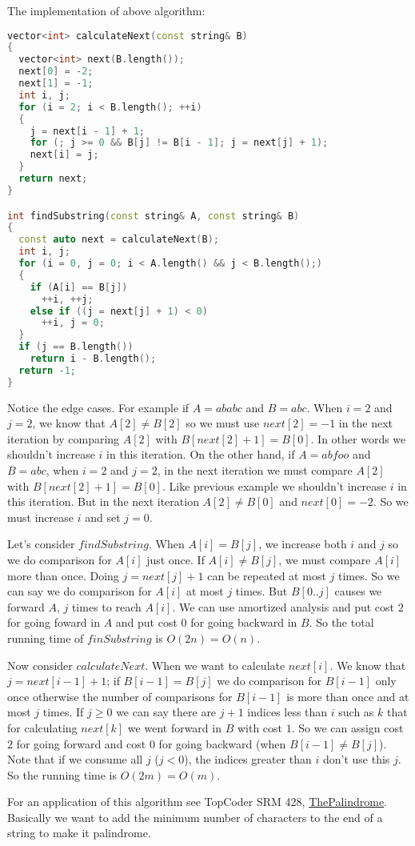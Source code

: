 \documentclass{book}
\begin{document}
	The implementation of above algorithm:
	\begin{lstlisting}[language=c++, frame=single]
vector<int> calculateNext(const string& B)
{
  vector<int> next(B.length());
  next[0] = -2;
  next[1] = -1;
  int i, j;
  for (i = 2; i < B.length(); ++i)
  {
    j = next[i - 1] + 1;
    for (; j >= 0 && B[j] != B[i - 1]; j = next[j] + 1);
    next[i] = j;
  }
  return next;
}

int findSubstring(const string& A, const string& B)
{
  const auto next = calculateNext(B);
  int i, j;
  for (i = 0, j = 0; i < A.length() && j < B.length();)
  {
    if (A[i] == B[j])
      ++i, ++j;
    else if ((j = next[j] + 1) < 0)
      ++i, j = 0;
  }
  if (j == B.length())
    return i - B.length();
  return -1;
}
	\end{lstlisting}
	Notice the edge cases. For example if $A=ababc$ and $B=abc$. When $i = 2$ and $j = 2$, we know that $A[2] \ne B[2]$ so we must use $next[2] = -1$ in the next iteration by comparing $A[2]$ with $B[next[2] + 1] = B[0]$. In other words we shouldn't increase $i$ in this iteration. On the other hand, if $A=abfoo$ and $B=abc$, when $i = 2$ and $j = 2$, in the next iteration we must compare $A[2]$ with $B[next[2] + 1] = B[0]$. Like previous example we shouldn't increase $i$ in this iteration. But in the next iteration $A[2] \ne B[0]$ and $next[0] = -2$. So we must increase $i$ and set $j=0$.
	\par Let's consider $findSubstring$. When $A[i] = B[j]$, we increase both $i$ and $j$ so we do comparison for $A[i]$ just once. If $A[i] \ne B[j]$, we must compare $A[i]$ more than once. Doing $j = next[j] + 1$ can be repeated at most $j$ times. So we can say we do comparison for $A[i]$ at most $j$ times. But $B[0..j]$ causes we forward $A$, $j$ times to reach $A[i]$. We can use amortized analysis and put cost $2$ for going foward in $A$ and put cost $0$ for going backward in $B$. So the total running time of $finSubstring$ is $O(2n) = O(n)$.
	\par Now consider $calculateNext$. When we want to calculate $next[i]$. We know that $j = next[i - 1] + 1$; if $B[i - 1] = B[j]$ we do comparison for $B[i - 1]$ only once otherwise the number of comparisons for $B[i - 1]$ is more than once and at most $j$ times. If $j \ge 0$ we can say there are $j + 1$ indices less than $i$ such as $k$ that for calculating $next[k]$ we went forward in $B$ with cost $1$. So we can assign cost $2$ for going forward and cost $0$ for going backward (when $B[i - 1] \ne B[j]$). Note that if we consume all $j$ ($j < 0$), the indices greater than $i$ don't use this $j$. So the running time is $O(2m) = O(m)$.
	\par For an application of this algorithm see TopCoder SRM 428, \href{https://community.topcoder.com/stat?c=problem_statement&pm=10182&rd=13519}{ThePalindrome}. Basically we want to add the minimum number of characters to the end of a string to make it palindrome.
\end{document}
